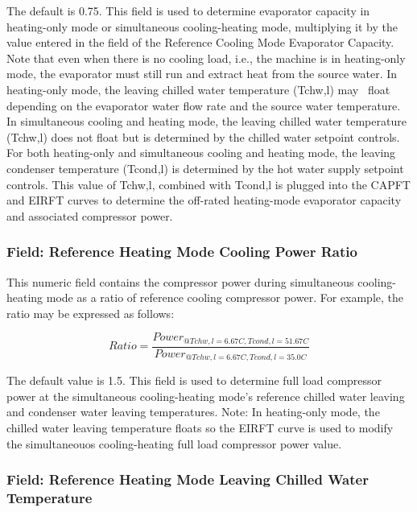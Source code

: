 The default is 0.75. This field is used to determine evaporator capacity in heating-only mode or simultaneous cooling-heating mode, multiplying it by the value entered in the field of the Reference Cooling Mode Evaporator Capacity. Note that even when there is no cooling load, i.e., the machine is in heating-only mode, the evaporator must still run and extract heat from the source water. In heating-only mode, the leaving chilled water temperature (Tchw,l) may ~float depending on the evaporator water flow rate and the source water temperature. In simultaneous cooling and heating mode, the leaving chilled water temperature (Tchw,l) does not float but is determined by the chilled water setpoint controls. For both heating-only and simultaneous cooling and heating mode, the leaving condenser temperature (Tcond,l) is determined by the hot water supply setpoint controls. This value of Tchw,l, combined with Tcond,l is plugged into the CAPFT and EIRFT curves to determine the off-rated heating-mode evaporator capacity and associated compressor power.

\subsubsection{Field: Reference Heating Mode Cooling Power Ratio}\label{field-reference-heating-mode-cooling-power-ratio}

This numeric field contains the compressor power during simultaneous cooling-heating mode as a ratio of reference cooling compressor power. For example, the ratio may be expressed as follows:

\begin{equation}
Ratio = \frac{{Powe{r_{@Tchw,l = 6.67C,Tcond,l = 51.67C}}}}{{Powe{r_{@Tchw,l = 6.67C,Tcond,l = 35.0C}}}}
\end{equation}

The default value is 1.5. This field is used to determine full load compressor power at the simultaneous cooling-heating mode's reference chilled water leaving and condenser water leaving temperatures. Note: In heating-only mode, the chilled water leaving temperature floats so the EIRFT curve is used to modify the simultaneouos cooling-heating full load compressor power value.

\subsubsection{Field: Reference Heating Mode Leaving Chilled Water Temperature}\label{field-reference-heating-mode-leaving-chilled-water-temperature}

